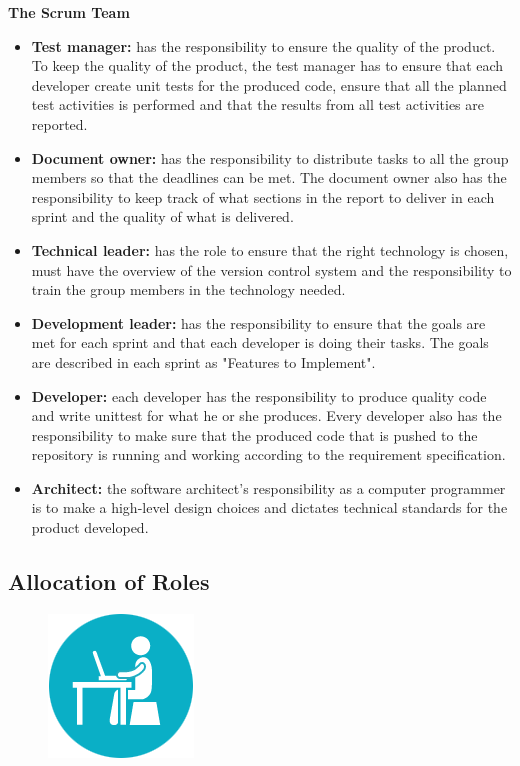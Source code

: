 \noindent
{\bf The Scrum Team}
\begin{itemize}

  \item {\bf Test manager:} has the responsibility to ensure the quality of the product. To keep the quality of the product, the test manager has to ensure that each developer create unit tests for the produced code, ensure that all the planned test activities is performed and that the results from all test activities are reported.

  \item {\bf Document owner:} has the responsibility to distribute tasks to all the group members so that the deadlines can be met. The document owner also has the responsibility to keep track of what sections in the report to deliver in each sprint and the quality of what is delivered.

  \item {\bf Technical leader:} has the role to ensure that the right technology is chosen, must have the overview of the version control system and the responsibility to train the group members in the technology needed.

  \item {\bf Development leader:} has the responsibility to ensure that the goals are met for each sprint and that each developer is doing their tasks. The goals are described in each sprint as "Features to Implement". 

  \item {\bf Developer:} each developer has the responsibility to produce quality code and write unittest for what he or she produces. Every developer also has the responsibility to make sure that the produced code that is pushed to the repository is running and working according to the requirement specification.

  \item{\bf Architect:} the software architect's responsibility as a computer programmer is to make a high-level design choices and dictates technical standards for the product developed.

  \end{itemize} 

\subsection{Allocation of Roles}
\begin{figure}
  \begin{center}
  \includegraphics[scale=0.7]{pictures/Work.png}
  \end{center}
\end{figure}

